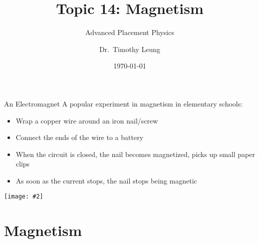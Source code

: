 \documentclass[12pt,aspectratio=169]{beamer}
\title{Topic 14: Magnetism}
\subtitle{Advanced Placement Physics}
\author[TML]{Dr.\ Timothy Leung}
\institute{Olympiads School}
\date{\today}
\newcommand{\pic}[2]{\texttt{[image: \#2]}}
\begin{document}
\begin{frame}
  \maketitle
\end{frame}


%
%


\begin{frame}{An Electromagnet}
  A popular experiment in magnetism in elementary schools:
  \begin{itemize}
  \item Wrap a copper wire around an iron nail/screw
  \item Connect the ends of the wire to a battery
  \item When the circuit is closed, the nail becomes magnetized, picks up
    small paper clips
  \item As soon as the current stops, the nail stops being magnetic
  \end{itemize}
  \begin{center}
    \pic{.4}{nail}
  \end{center}
\end{frame}


\section{Magnetism}
\end{document}
